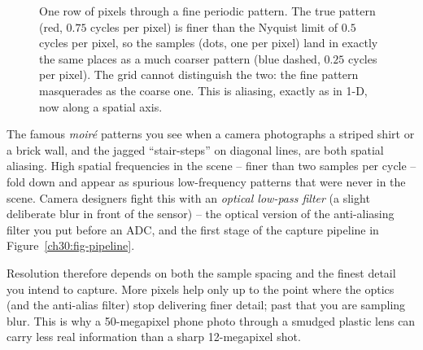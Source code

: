 \begin{figure}[H]
\centering
{}
\caption{One row of pixels through a fine periodic pattern. The true pattern (red,
$0.75$ cycles per pixel) is finer than the Nyquist limit of $0.5$ cycles per pixel,
so the samples (dots, one per pixel) land in exactly the same places as a much
coarser pattern (blue dashed, $0.25$ cycles per pixel). The grid cannot distinguish
the two: the fine pattern masquerades as the coarse one. This is aliasing, exactly
as in 1-D, now along a spatial axis.}
\label{ch30:fig-alias1d}
\end{figure}

\begin{happeningbox}
The famous \emph{moir\'e} patterns you see when a camera photographs a striped
shirt or a brick wall, and the jagged ``stair-steps'' on diagonal lines, are both
spatial aliasing. High spatial frequencies in the scene -- finer than two samples
per cycle -- fold down and appear as spurious low-frequency patterns that were
never in the scene. Camera designers fight this with an \emph{optical low-pass
filter} (a slight deliberate blur in front of the sensor) -- the optical version
of the anti-aliasing filter you put before an ADC, and the first stage of the
capture pipeline in Figure~\ref{ch30:fig-pipeline}.
\end{happeningbox}

Resolution therefore depends on both the sample spacing and the finest detail
you intend to capture. More pixels help only up to the point where the optics
(and the anti-alias filter) stop delivering finer detail; past that you are
sampling blur. This is why a 50-megapixel phone photo through a smudged plastic
lens can carry less real information than a sharp 12-megapixel shot.

